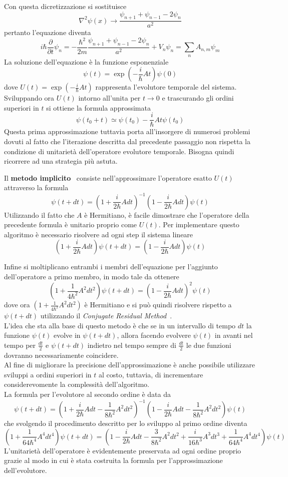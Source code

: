 Con questa dicretizzazione si sostituisce
$$\nabla^2\psi(x) \rightarrow \frac{\psi_{n+1}+\psi_{n-1}-2\psi_n}{a^2} $$
pertanto l'equazione diventa
$$i\hbar\frac{\partial}{\partial t} \psi_n = -\frac{\hbar^2}{2m}\frac{\psi_{n+1}+\psi_{n-1}-2\psi_n}{a^2} + V_n\psi_n = \sum\limits_{n}A_{n,m}\psi_m$$
La soluzione dell'equazione è la funzione esponenziale
$$\psi(t)=\exp\left(-\frac{i}{\hbar}At\right)\psi(0)$$
dove $U(t) = \exp(-\frac{i}{\hbar}At)$ rappresenta l'evolutore temporale del sistema. Sviluppando ora $U(t)$ intorno all'unita per $t\rightarrow 0$ e trascurando gli ordini superiori in $t$ si ottiene la formula approssimata
$$\psi(t_0+t)\simeq\psi(t_0)-\frac{i}{\hbar}At\psi(t_0)$$
Questa prima approssimazione tuttavia porta all'insorgere di numerosi problemi dovuti al fatto che l'iterazione descritta dal precedente passaggio non rispetta la condizione di unitarietà dell'operatore evolutore temporale. Bisogna quindi ricorrere ad una strategia più astuta.

Il \textbf{metodo implicito}~\cite{cinque} consiste nell'approssimare l'operatore esatto $U(t)$ attraverso la formula
$$\psi(t+dt)=(1+\frac{i}{2\hbar}Adt)^{-1}(1-\frac{i}{2\hbar}Adt)\psi(t)$$
Utilizzando il fatto che $A$ è Hermitiano, è facile dimostrare che l'operatore della precedente formula è unitario proprio come $U(t)$.
Per implementare questo algoritmo è necessario risolvere ad ogni step il sistema lineare
$$(1+\frac{i}{2\hbar}Adt)\psi(t+dt)=(1-\frac{i}{2\hbar}Adt)\psi(t)$$

Infine si moltiplicano entrambi i membri dell'equazione per l'aggiunto dell'operatore a primo membro, in modo tale da ottenere
$$(1+\frac{1}{4\hbar^2}A^2dt^2)\psi(t+dt)=(1-\frac{i}{2\hbar}Adt)^2\psi(t)$$
dove ora $(1+\frac{1}{4\hbar^2}A^2dt^2)$ è Hermitiano e si può quindi risolvere rispetto a $\psi(t+dt)$ utilizzando il \textit{Conjugate Residual Method}~\cite{tre}.\\

L'idea che sta alla base di questo metodo è che se in un intervallo di tempo $dt$ la funzione $\psi(t)$ evolve in $\psi(t+dt)$, allora facendo evolvere $\psi(t)$ in avanti nel tempo per $\frac{dt}{2}$ e $\psi(t+dt)$ indietro nel tempo sempre di $\frac{dt}{2}$ le due funzioni dovranno necessariamente coincidere.
\\

Al fine di migliorare la precisione dell'approssimazione è anche possibile utilizzare sviluppi a ordini superiori in $t$ al costo, tuttavia, di incrementare considerevomente la complessità dell'algoritmo.
\\

La formula per l'evolutore al secondo ordine è data da
$$\psi(t+dt)=\left(1+\frac{i}{2\hbar}Adt-\frac{1}{8\hbar^2}A^2dt^2\right)^{-1}\left(1-\frac{i}{2\hbar}Adt-\frac{1}{8\hbar^2}A^2dt^2\right)\psi(t)$$
che svolgendo il procedimento descritto per lo sviluppo al primo ordine diventa
$$\left(1+\frac{1}{64\hbar^4}A^4dt^4\right)\psi(t+dt)=\left(1-\frac{i}{2\hbar}Adt-\frac{3}{8\hbar^2}A^2dt^2+\frac{i}{16\hbar^3}A^3dt^3+\frac{1}{64\hbar^4}A^4dt^4\right)\psi(t)$$
L'unitarietà dell'operatore è evidentemente preservata ad ogni ordine proprio grazie al modo in cui è stata costruita la formula per l'approssimazione dell'evolutore.
